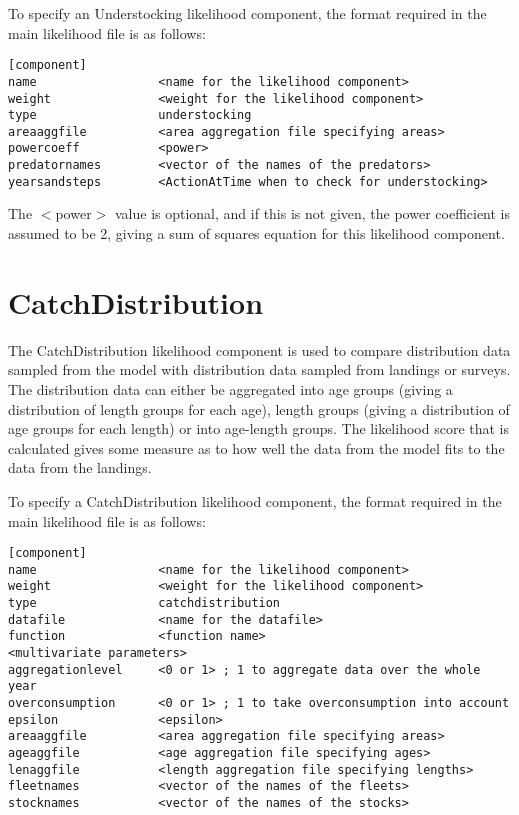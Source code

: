 \documentclass [a4paper, 10pt]{book}
\begin{document}
\bigskip
To specify an Understocking likelihood component, the format required in the main likelihood file is as follows:

{\small\begin{verbatim}
[component]
name                 <name for the likelihood component>
weight               <weight for the likelihood component>
type                 understocking
areaaggfile          <area aggregation file specifying areas>
powercoeff           <power>
predatornames        <vector of the names of the predators>
yearsandsteps        <ActionAtTime when to check for understocking>
\end{verbatim}}

The $<$power$>$ value is optional, and if this is not given, the power coefficient is assumed to be 2, giving a sum of squares equation for this likelihood component.

\newpage %
\section{CatchDistribution}\label{sec:catchdist}
The CatchDistribution likelihood component is used to compare distribution data sampled from the model with distribution data sampled from landings or surveys.  The distribution data can either be aggregated into age groups (giving a distribution of length groups for each age), length groups (giving a distribution of age groups for each length) or into age-length groups.  The likelihood score that is calculated gives some measure as to how well the data from the model fits to the data from the landings.

\bigskip
To specify a CatchDistribution likelihood component, the format required in the main likelihood file is as follows:

{\small\begin{verbatim}
[component]
name                 <name for the likelihood component>
weight               <weight for the likelihood component>
type                 catchdistribution
datafile             <name for the datafile>
function             <function name>
<multivariate parameters>
aggregationlevel     <0 or 1> ; 1 to aggregate data over the whole year
overconsumption      <0 or 1> ; 1 to take overconsumption into account
epsilon              <epsilon>
areaaggfile          <area aggregation file specifying areas>
ageaggfile           <age aggregation file specifying ages>
lenaggfile           <length aggregation file specifying lengths>
fleetnames           <vector of the names of the fleets>
stocknames           <vector of the names of the stocks>
\end{verbatim}}
\end{document}
